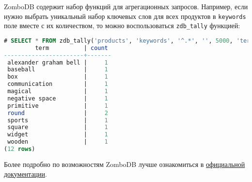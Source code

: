 ZomboDB содержит набор функций для агрегационных запросов. Например, если нужно выбрать уникальный набор ключевых слов для всех продуктов в \lstinline!keywords! поле вместе с их количеством, то можно воспользоваться \lstinline!zdb_tally! функцией:

\begin{lstlisting}[language=SQL,label=lst:zombodb8,caption=Zdb\_tally]
# SELECT * FROM zdb_tally('products', 'keywords', '^.*', '', 5000, 'term');
         term          | count
-----------------------+-------
 alexander graham bell |     1
 baseball              |     1
 box                   |     1
 communication         |     1
 magical               |     1
 negative space        |     1
 primitive             |     1
 round                 |     2
 sports                |     1
 square                |     1
 widget                |     1
 wooden                |     1
(12 rows)
\end{lstlisting}

Более подробно по возможностям ZomboDB лучше ознакомиться в \href{https://github.com/zombodb/zombodb#quick-links}{официальной документации}.
